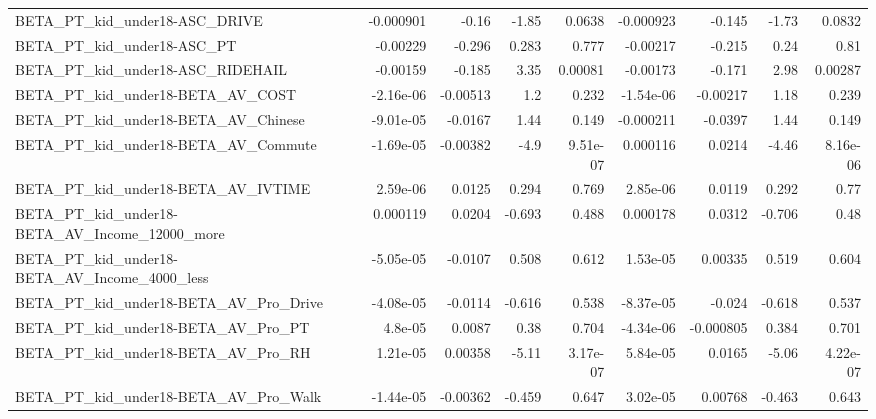 \begin{tabular}{lrrrrrrrr}
BETA\_PT\_kid\_under18-ASC\_DRIVE                      &   -0.000901 &        -0.16 &     -1.85 &   0.0638 &  -0.000923 &      -0.145 &        -1.73 &        0.0832 \\
BETA\_PT\_kid\_under18-ASC\_PT                         &    -0.00229 &       -0.296 &     0.283 &    0.777 &   -0.00217 &      -0.215 &         0.24 &          0.81 \\
BETA\_PT\_kid\_under18-ASC\_RIDEHAIL                   &    -0.00159 &       -0.185 &      3.35 &  0.00081 &   -0.00173 &      -0.171 &         2.98 &       0.00287 \\
BETA\_PT\_kid\_under18-BETA\_AV\_COST                   &   -2.16e-06 &     -0.00513 &       1.2 &    0.232 &  -1.54e-06 &    -0.00217 &         1.18 &         0.239 \\
BETA\_PT\_kid\_under18-BETA\_AV\_Chinese                &   -9.01e-05 &      -0.0167 &      1.44 &    0.149 &  -0.000211 &     -0.0397 &         1.44 &         0.149 \\
BETA\_PT\_kid\_under18-BETA\_AV\_Commute                &   -1.69e-05 &     -0.00382 &      -4.9 & 9.51e-07 &   0.000116 &      0.0214 &        -4.46 &      8.16e-06 \\
BETA\_PT\_kid\_under18-BETA\_AV\_IVTIME                 &    2.59e-06 &       0.0125 &     0.294 &    0.769 &   2.85e-06 &      0.0119 &        0.292 &          0.77 \\
BETA\_PT\_kid\_under18-BETA\_AV\_Income\_12000\_more      &    0.000119 &       0.0204 &    -0.693 &    0.488 &   0.000178 &      0.0312 &       -0.706 &          0.48 \\
BETA\_PT\_kid\_under18-BETA\_AV\_Income\_4000\_less       &   -5.05e-05 &      -0.0107 &     0.508 &    0.612 &   1.53e-05 &     0.00335 &        0.519 &         0.604 \\
BETA\_PT\_kid\_under18-BETA\_AV\_Pro\_Drive              &   -4.08e-05 &      -0.0114 &    -0.616 &    0.538 &  -8.37e-05 &      -0.024 &       -0.618 &         0.537 \\
BETA\_PT\_kid\_under18-BETA\_AV\_Pro\_PT                 &     4.8e-05 &       0.0087 &      0.38 &    0.704 &  -4.34e-06 &   -0.000805 &        0.384 &         0.701 \\
BETA\_PT\_kid\_under18-BETA\_AV\_Pro\_RH                 &    1.21e-05 &      0.00358 &     -5.11 & 3.17e-07 &   5.84e-05 &      0.0165 &        -5.06 &      4.22e-07 \\
BETA\_PT\_kid\_under18-BETA\_AV\_Pro\_Walk               &   -1.44e-05 &     -0.00362 &    -0.459 &    0.647 &   3.02e-05 &     0.00768 &       -0.463 &         0.643 \\

\end{tabular}
